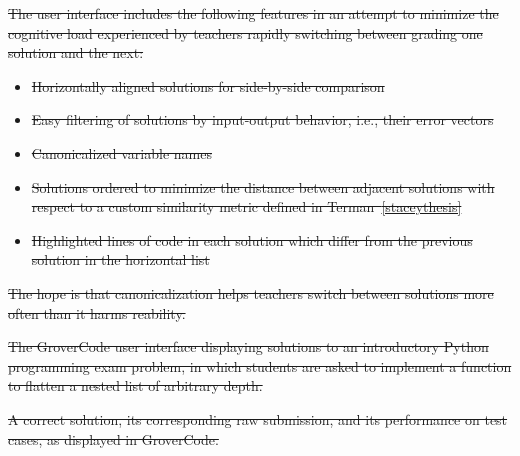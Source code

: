 \documentclass[12pt,twoside]{mitthesis}
\providecommand{\DIFdeltex}[1]{{\protect\color{red}\sout{#1}}}                      %
\providecommand{\DIFdelFL}[1]{\DIFdel{#1}} %
\providecommand{\DIFdel}[1]{\texorpdfstring{\DIFdeltex{#1}}{}} %
\begin{document}
\DIFdel{The user interface includes the following features in an attempt to minimize the cognitive load experienced by teachers rapidly switching between grading one solution and the next:
}%
 \begin{itemize} %
\item%
\DIFdel{Horizontally aligned solutions for side-by-side comparison
}%
\item%
\DIFdel{Easy filtering of solutions by input-output behavior, i.e., their error vectors
}%
\item%
\DIFdel{Canonicalized variable names
}%
\item%
\DIFdel{Solutions ordered to minimize the distance between adjacent solutions with respect to a custom similarity metric defined in Terman~\ref{staceythesis}
}%
\item%
\DIFdel{Highlighted lines of code in each solution which differ from the previous solution in the horizontal list
}
 \end{itemize} %

\DIFdel{The hope is that canonicalization helps teachers switch between solutions more often than it harms reability.
}%

{%
\DIFdelFL{The GroverCode user interface displaying solutions to an introductory Python programming exam problem, in which students are asked to implement a function to flatten a nested list of arbitrary depth.
}}

{%
\DIFdelFL{A correct solution, its corresponding raw submission, and its performance on test cases, as displayed in GroverCode.}}
\end{document}
